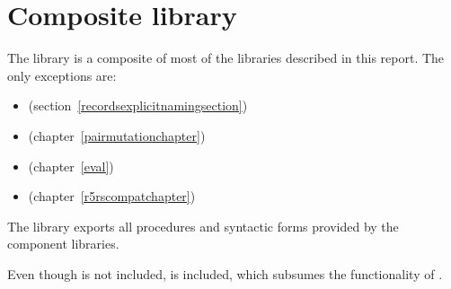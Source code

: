 \chapter{Composite library}
\label{complibchapter}

The  library is a composite of most of the libraries
described in this report.  The only exceptions are:
%
\begin{itemize}
\item {} (section~\ref{recordsexplicitnamingsection})
\item {} (chapter~\ref{pairmutationchapter})
\item {} (chapter~\ref{eval})
\item {} (chapter~\ref{r5rscompatchapter})
\end{itemize}
%
The library exports all procedures and syntactic forms provided by the
component libraries.

\begin{note}
  Even though  is not
  included,  is included, which
  subsumes the functionality of .
\end{note}
